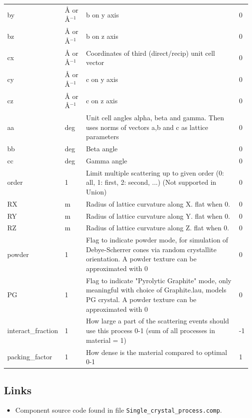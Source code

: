 \begin{longtable}{p{}p{}p{}p{}}
by & \AA{} or \AA{}$^{-1}$ & b on y axis & 0 \\
bz & \AA{} or \AA{}$^{-1}$ & b on z axis & 0 \\
cx & \AA{} or \AA{}$^{-1}$ & Coordinates of third (direct/recip) unit cell vector & 0 \\
cy & \AA{} or \AA{}$^{-1}$ & c on y axis & 0 \\
cz & \AA{} or \AA{}$^{-1}$ & c on z axis & 0 \\
aa & deg & Unit cell angles alpha, beta and gamma. Then uses norms of vectors a,b and c as lattice parameters & 0 \\
bb & deg & Beta angle & 0 \\
cc & deg & Gamma angle & 0 \\
order & 1 & Limit multiple scattering up to given order (0: all, 1: first, 2: second, ...) (Not supported in Union) & 0 \\
RX & m & Radius of lattice curvature along X. flat when 0. & 0 \\
RY & m & Radius of lattice curvature along Y. flat when 0. & 0 \\
RZ & m & Radius of lattice curvature along Z. flat when 0. & 0 \\
powder & 1 & Flag to indicate powder mode, for simulation of Debye-Scherrer cones via random crystallite orientation. A powder texture can be approximated with 0 & 0 \\
PG & 1 & Flag to indicate "Pyrolytic Graphite" mode, only meaningful with choice of Graphite.lau, models PG crystal. A powder texture can be approximated with 0 & 0 \\
interact\_fraction & 1 & How large a part of the scattering events should use this process 0-1 (sum of all processes in material = 1) & -1 \\
packing\_factor & 1 & How dense is the material compared to optimal 0-1 & 1 \\
\bottomrule
\end{longtable}

\subsection*{Links}
\begin{itemize}
  \item Component source code found in file \texttt{Single\_crystal\_process.comp}.
\end{itemize}
